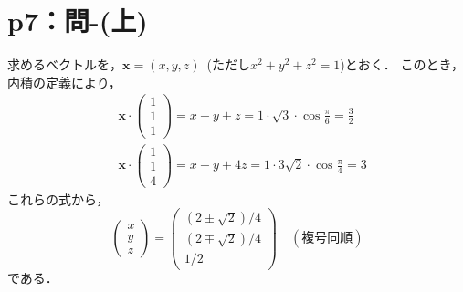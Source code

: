 \documentclass[a4paper,10pt,fleqn]{ltjsarticle}
\begin{document}
\section*{p7：問-(上)}


\begin{tleftbar}
    求めるベクトルを，$\bm{x}=(x,y,z)$~(ただし$x^2+y^2 +z^2=1$)とおく．
    このとき，内積の定義により，
    \begin{align*}
         & \bm{x} \cdot
        \begin{pmatrix}
            1 \\
            1 \\
            1
        \end{pmatrix}
        =x+y+z= 1 \cdot \sqrt{3} \cdot \cos \frac{\pi}{6} =\frac{3}{2} \\
         & \bm{x} \cdot
        \begin{pmatrix}
            1 \\
            1 \\
            4
        \end{pmatrix}
        =x+y+4z= 1 \cdot 3\sqrt{2} \cdot \cos \frac{\pi}{4} =3
    \end{align*}
    これらの式から，
    \begin{equation*}
        \begin{pmatrix}
            x \\
            y \\
            z
        \end{pmatrix}
        =
        \begin{pmatrix}
            (2 \pm \sqrt{2})/4 \\
            (2 \mp \sqrt{2})/4 \\
            1/2
        \end{pmatrix}
        \quad (\text{複号同順})
    \end{equation*}
    である．
\end{tleftbar}
\end{document}
